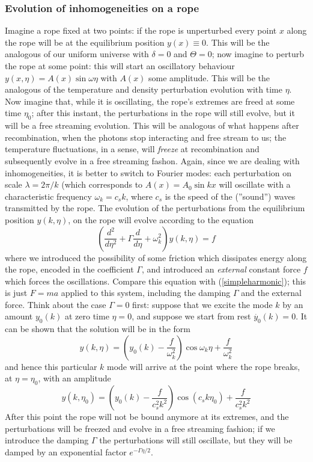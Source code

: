 \documentclass[11pt, a4paper,oneside,openright]{book}
\numberwithin{equation}{section}
\begin{document}
\subsubsection{Evolution of inhomogeneities on a rope}
Imagine a rope fixed at two points: if the rope is unperturbed every point $x$ along the rope will be at the equilibrium position $y(x)\equiv0$. This will be the analogous of our uniform universe with $\delta=0$ and $\Theta=0$; now imagine to perturb the rope at some point: this will start an oscillatory behaviour $y(x,\eta)=A(x)\sin{\omega \eta}$ with $A(x)$ some amplitude. This will be the analogous of the temperature and density perturbation evolution with time $\eta$. Now imagine that, while it is oscillating, the rope's extremes are freed at some time $\eta_0$; after this instant, the perturbations in the rope will still evolve, but it will be a free streaming evolution. This will be analogous of what happens after recombination, when the photons stop interacting and free stream to us; the temperature fluctuations, in a sense, will \textit{freeze} at recombination and subsequently evolve in a free streaming fashon. Again, since we are dealing with inhomogeneities, it is better to switch to Fourier modes:
 each perturbation on scale $\lambda=2\pi/k$ (which corresponds to $A(x)=A_0\sin{kx}$ will oscillate with a characteristic frequency $\omega_k=c_s k$, where $c_s$ is the speed of the (''sound'') waves transmitted by the rope. The evolution of the perturbations from the equilibrium position $y(k,\eta)$, on the rope will evolve according to the equation
\begin{equation}
\label{ropewaveeq}
\left(\frac{d^2}{d\eta^2}+\Gamma \frac{d}{d\eta}+\omega_k^2\right)y(k,\eta)=f
\end{equation}
where we introduced the possibility of some friction which dissipates energy along the rope, encoded in the coefficient $\Gamma$, and introduced an \textit{external} constant force $f$ which forces the oscillations. Compare this equation with (\ref{simpleharmonic}); this is just $F=ma$ applied to this system, including the damping $\Gamma$ and the external force. Think about the case $\Gamma=0$ first: suppose that we excite the mode $k$ by an amount $y_0(k)$ at zero time $\eta=0$, and suppose we start from rest $\dot{y_0}(k)=0$. It can be shown that the solution will be in the form 
\begin{equation}
y(k,\eta)=\left(y_0(k)-\frac{f}{\omega_k^2}\right)\cos{\omega_k\eta}+\frac{f}{\omega_k^2}
\end{equation}
and hence this particular $k$ mode will arrive at the point where the rope breaks, at $\eta=\eta_0$, with an amplitude
\begin{equation}
\label{pertfreeze}
y(k,\eta_0)=\left(y_0(k)-\frac{f}{c_s^2k^2}\right)\cos{(c_sk\eta_0)}+\frac{f}{c_s^2k^2}
\end{equation}
After this point the rope will not be bound anymore at its extremes, and the perturbations will be freezed and evolve in a free streaming fashion; if we introduce the damping $\Gamma$ the perturbations will still oscillate, but they will be damped by an exponential factor $e^{-\Gamma \eta/2}$. 
\end{document}
